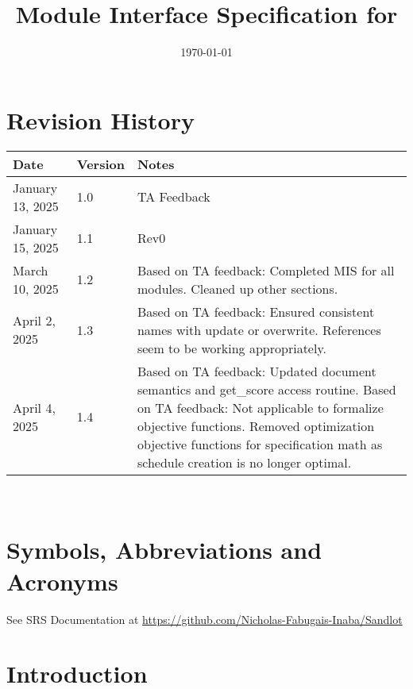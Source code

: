 \documentclass[12pt, titlepage]{article}
\begin{document}
\title{Module Interface Specification for \progname{}}

\author{\authname}

\date{\today}

\maketitle


\section{Revision History}

\begin{tabularx}{\textwidth}{p{3cm}p{2cm}X}
\toprule {\bf Date} & {\bf Version} & {\bf Notes}\\
\midrule
January 13, 2025 & 1.0 & TA Feedback\\
January 15, 2025 & 1.1 & Rev0\\
March 10, 2025 & 1.2 & Based on TA feedback: Completed MIS for all modules. Cleaned up other sections.\\
April 2, 2025 & 1.3 & Based on TA feedback: Ensured consistent names with
update or overwrite. References seem to be working appropriately.\\
April 4, 2025 & 1.4 & Based on TA feedback: Updated document semantics and
get\_score access routine. Based on TA feedback: Not applicable to formalize objective functions. Removed 
optimization objective functions for specification math as schedule creation is no longer optimal.\\
\bottomrule
\end{tabularx}

~\newpage

\section{Symbols, Abbreviations and Acronyms}

See SRS Documentation at \url{https://github.com/Nicholas-Fabugais-Inaba/Sandlot}

\newpage

\tableofcontents

\newpage


\section{Introduction}
\end{document}
